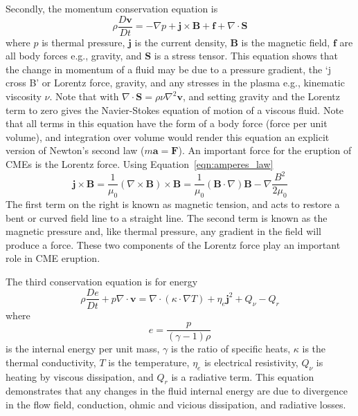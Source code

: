 Secondly, the momentum conservation equation is
\begin{equation}
\rho\frac{D\mathbf{v}}{Dt}=-\nabla p + \mathbf{j}\times \mathbf{B} + \mathbf{f} +\nabla \cdot \mathbf{S}
\label{eqn:mhd_momentum}
\end{equation}
where $p$ is thermal pressure, $\mathbf{j}$ is the current density, $\mathbf{B}$ is the magnetic field, $\mathbf{f}$ are all body forces e.g., gravity, and $\mathbf{S}$ is a stress tensor. This equation shows that the change in momentum of a fluid may be due to a pressure gradient, the \textquoteleft j cross B' or Lorentz force, gravity, and any stresses in the plasma e.g., kinematic viscosity $\nu$. Note that with $\nabla \cdot \mathbf{S}=\rho\nu\nabla^2\mathbf{v} $, and setting gravity and the Lorentz term to zero gives the Navier-Stokes equation of motion of a viscous fluid. Note that all terms in this equation have the form of a body force (force per unit volume), and integration over volume would render this equation an explicit version of Newton's second law ($m\mathbf{a}=\mathbf{F}$). An important force for the eruption of CMEs is the Lorentz force. Using Equation~\ref{eqn:amperes_law}
\begin{equation}
\mathbf{j}\times \mathbf{B} = \frac{1}{\mu_0}(\nabla \times \mathbf{B})\times \mathbf{B} = \frac{1}{\mu_0}(\mathbf{B} \cdot \nabla)\mathbf{B} - \nabla \frac{B^2}{2\mu_0}
\end{equation}
The first term on the right is known as magnetic tension, and acts to restore a bent or curved field line to a straight line. The second term is known as the magnetic pressure and, like thermal pressure, any gradient in the field will produce a force. These two components of the Lorentz force play an important role in CME eruption.

The third conservation equation is for energy
\begin{equation}
\rho\frac{De}{Dt} + p\nabla\cdot \mathbf{v}=\nabla\cdot(\kappa\cdot\nabla T) +  \eta_e\mathbf{j}^2 + Q_{\nu} - Q_r
\end{equation}
where 
\begin{equation}
e = \frac{p}{(\gamma-1)\rho}
\end{equation}
is the internal energy per unit mass, $\gamma$ is the ratio of specific heats, $\kappa$ is the thermal conductivity, $T$ is the temperature, $\eta_e$ is electrical resistivity, $Q_{\nu}$ is heating by viscous dissipation, and $Q_r$ is a radiative term. This equation demonstrates that any changes in the fluid internal energy are due to divergence in the flow field, conduction, ohmic and vicious dissipation, and radiative losses.

